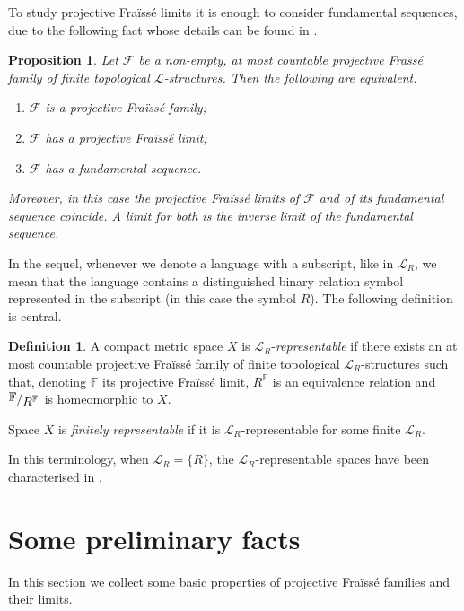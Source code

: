 \documentclass[12pt,twoside,a4paper]{amsart}
\theoremstyle{plain}
\newtheorem{proposition}[theorem]{Proposition}
\theoremstyle{definition}
\newtheorem{definition}{Definition}
\begin{document}
To study projective Fra\"iss\'e limits it is enough to consider fundamental sequences, due to the following fact whose details can be found in \cite{Camerl2010}.

\begin{proposition}
Let $ \mathcal F $ be a non-empty, at most countable projective Fra\"ss\'e family of finite topological $ \mathcal L $-structures.
Then the following are equivalent.
\begin{enumerate}
\item $ \mathcal F $ is a projective Fra\"iss\'e family;
\item $ \mathcal F $ has a projective Fra\"iss\'e limit;
\item $ \mathcal F $ has a fundamental sequence.
\end{enumerate}
Moreover, in this case the projective Fra\"iss\'e limits of $ \mathcal F $ and of its fundamental sequence coincide.
A limit for both is the inverse limit of the fundamental sequence.
\end{proposition}

In the sequel, whenever we denote a language with a subscript, like in $ \mathcal L_R$, we mean that the language contains a distinguished binary relation symbol represented in the subscript (in this case the symbol $R$).
The following definition is central.

\begin{definition}
A compact metric space $X$ is $ \mathcal L_R$-{\it representable} if there exists an at most countable projective Fra\"iss\'e family of finite topological $ \mathcal L_R $-structures such that, denoting $ \mathbb F $ its projective Fra\"iss\'e limit, $R^{ \mathbb F }$ is an equivalence relation and $ {{\raisebox{.2em}{${ \mathbb F }\!$}\left/\raisebox{-.2em}{${R^{ \mathbb F }}$}\right.}} $ is homeomorphic to $X$.

Space $X$ is {\it finitely representable} if it is $ \mathcal L_R$-representable for some finite $ \mathcal L_R$.
\end{definition}

In this terminology, when $ \mathcal L_R=\{ R\} $, the $ \mathcal L_R$-representable spaces have been characterised in \cite{Camerl2010}.

\section{Some preliminary facts} \label{facts}
In this section we collect some basic properties of projective Fra\"iss\'e families and their limits.
\end{document}

